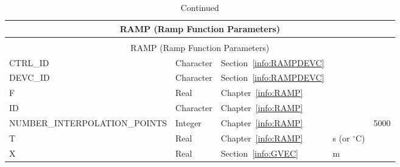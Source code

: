 \documentclass[11pt]{book}
\begin{document}
\begin{longtable}{@{\extracolsep{\fill}}|l|l|l|l|l|}
\caption[Ramp function parameters ({\ct RAMP} namelist group)]{For more information see Chapter~\ref{info:RAMP}.}
\label{tbl:RAMP} \\
\hline
\multicolumn{5}{|c|}{{\ct RAMP} (Ramp Function Parameters)} \\
\hline \hline
\endfirsthead
\caption[]{Continued} \\
\hline
\multicolumn{5}{|c|}{{\ct RAMP} (Ramp Function Parameters)} \\
\hline \hline
\endhead
{\ct CTRL\_ID}                      & Character     & Section~\ref{info:RAMPDEVC}   &                       &           \\ \hline
{\ct DEVC\_ID}                      & Character     & Section~\ref{info:RAMPDEVC}   &                       &           \\ \hline
{\ct F}                             & Real          & Chapter~\ref{info:RAMP}       &                       &           \\ \hline
{\ct ID}                            & Character     & Chapter~\ref{info:RAMP}       &                       &           \\ \hline
{\ct NUMBER\_INTERPOLATION\_POINTS} & Integer       & Chapter~\ref{info:RAMP}       &                       &  5000     \\ \hline
{\ct T}                             & Real          & Chapter~\ref{info:RAMP}       & s (or $^\circ$C)      &           \\ \hline
{\ct X}                             & Real          & Section~\ref{info:GVEC}       & m                     &           \\ \hline
\end{longtable}

\vspace{\baselineskip}
\end{document}
